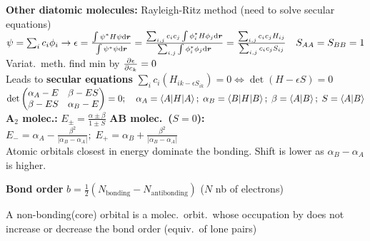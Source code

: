 \begin{squishlist}
    \item \textbf{Other diatomic molecules:} Rayleigh-Ritz method (need to solve secular equations)\\
    $\psi = \sum_i c_i \phi_i \rightarrow \epsilon = \frac{\int \psi^* H \psi \textrm{d} \bm{r}}{\int \psi^* \psi \textrm{d} \bm{r}} = \frac{\sum_{i,j}c_ic_j \int \phi_i^* H \phi_j \textrm{d} \bm{r}}{\sum_{i,j}\int \phi_i^* \phi_j \textrm{d} \bm{r}} = \frac{\sum_{i,j}c_i c_j H_{ij}}{\sum_{i,j}c_i c_j S_{ij}} \quad S_{AA} = S_{BB} = 1$\\
    Variat.\ meth.\: find min by $\frac{\partial \epsilon}{\partial c_k} = 0$ \\
    Leads to \textbf{secular equations} $\sum_i c_i (H_{ik - \epsilon S_{ik}}) = 0 \Longleftrightarrow \det(H - \epsilon S) = 0$\\
    $\det \begin{pmatrix}
        \alpha_A - E & \beta - ES \\
        \beta - ES   & \alpha_B - E
    \end{pmatrix} = 0; \quad \alpha_A = \braket{A|H|A};\; \alpha_B = \braket{B|H|B};\; \beta = \braket{A|B};\; S = \braket{A|B}$ \\
    \textbf{A$_2$ molec.:} $E_{\pm} = \frac{\alpha \pm \beta}{1\pm S}$ \qquad
    \textbf{AB molec.\ ($S=0$):} $E_- = \alpha_A - \frac{\beta^2}{|\alpha_B - \alpha_A|};\; E_+ = \alpha_B + \frac{\beta^2}{|\alpha_B - \alpha_A|}$  \\Atomic orbitals closest in energy dominate the bonding. Shift is lower as $\alpha_B - \alpha_A$ is higher.

    \squishline

    \item \textbf{Bond order} $b = \frac{1}{2} (N_{\text{bonding}} - N_{\text{antibonding}})$ \quad ($N$ nb of electrons)
    \item A non-bonding(core) orbital is a molec.\ orbit.\ whose occupation by \elec does not increase or decrease the bond order (equiv.\ of lone pairs)
    

\end{squishlist}
